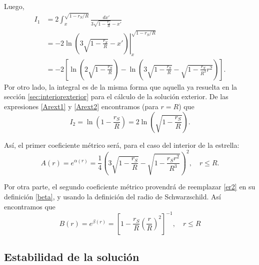 Luego,
\begin{align}
I_1 &= 2\int_x^{\sqrt{1-{r_S}/{R}}}\frac{dx'}{3\sqrt{1-\frac{r_s}{R}}-x'}\\
&=-2\ln\left.\left(3\sqrt{1-\frac{r_S}{R}}-x'\right)\right|_{x}^{\sqrt{1-{r_S}/{R}}}\\
&=-2\left[\ln\left(2\sqrt{1-\frac{r_S}{R}}\right)-\ln\left(3\sqrt{1-\frac{r_S}{R}}-\sqrt{1-\frac{r_S}{R^3}r^2}\right)\right].
\end{align}
Por otro lado, la integral es de la misma forma que aquella ya resuelta en la sección \ref{sec:interiorexterior} para el cálculo de la solución exterior. De las expresiones \eqref{Arext1} y \eqref{Arext2} encontramos (para $r=R$) que
\begin{equation}
I_2=\ln\left(1-\frac{r_S}{R}\right)=2\ln\left(\sqrt{1-\frac{r_S}{R}}\right).
\end{equation}

Así, el primer coeficiente métrico será, para el caso del interior de la estrella:
\begin{equation}
\boxed{A(r)=e^{\alpha(r)}=\frac{1}{4}\left(3\sqrt{1-\frac{r_S}{R}}-\sqrt{1-\frac{r_Sr^2}{R^3}}\right)^2,\quad r\leq R.}
\end{equation}

Por otra parte, el segundo coeficiente métrico provendrá de reemplazar \eqref{er2} en su definición \eqref{beta}, y usando la definición del radio de Schwarzschild. Así encontramos que
\begin{equation}
 \boxed{B(r)=e^{\beta(r)}=\left[1-\frac{r_S}{R}\left(\frac{r}{R}\right)^2\right]^{-1},\quad r\leq R}
\end{equation}

\subsection{Estabilidad de la solución}

